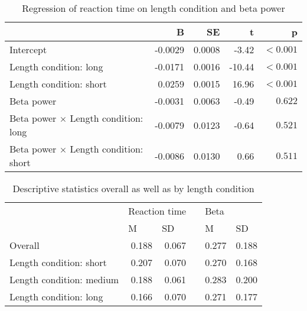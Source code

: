 \documentclass[man,floatsintext]{apa6} %
\begin{document}
\begin{table}[ht]
  \caption{Regression of reaction time on length condition and beta power}
  \centering
  \begin{tabular}{lrrrr}
    \toprule
                                                  & B        & SE         & t       & p         \\
    \midrule
    Intercept                                     & -0.0029  & 0.0008     &  -3.42  & $< 0.001$ \\
    Length condition: long                        & -0.0171  & 0.0016     & -10.44  & $< 0.001$ \\
    Length condition: short                       &  0.0259  & 0.0015     &  16.96  & $< 0.001$ \\
    Beta power                                    & -0.0031  & 0.0063     &  -0.49  & $0.622$   \\
    Beta power $\times$ Length condition: long    & -0.0079  & 0.0123     &  -0.64  & $0.521$   \\
    Beta power $\times$ Length condition: short   & -0.0086  & 0.0130     &   0.66  & $0.511$   \\
    \bottomrule
  \end{tabular}
\end{table}

\begin{table}[ht]
  \caption{Descriptive statistics overall as well as by length condition}
  \centering
  \begin{tabular}{lrrrrr}
    \toprule
                             & \multicolumn{2}{l}{Reaction time}              && \multicolumn{2}{l}{Beta}                       \\ \cmidrule{2-3} \cmidrule{5-6}
                             & \multicolumn{1}{l}{M} & \multicolumn{1}{l}{SD} && \multicolumn{1}{l}{M} & \multicolumn{1}{l}{SD} \\
    \midrule
    Overall                  & 0.188                 &  0.067                 && 0.277                 & 0.188                  \\
    Length condition: short  & 0.207                 &  0.070                 && 0.270                 & 0.168                  \\
    Length condition: medium & 0.188                 &  0.061                 && 0.283                 & 0.200                  \\
    Length condition: long   & 0.166                 &  0.070                 && 0.271                 & 0.177                  \\
    \bottomrule
  \end{tabular}
\end{table}
\end{document}
